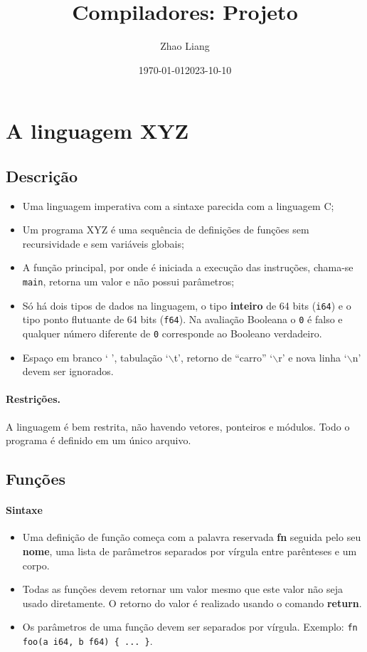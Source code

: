 \documentclass{article}
\date{\today}
\title{Compiladores: Projeto}
\author{Zhao Liang}
\date{2023-10-10}
\def\lang{{\sc XYZ}}
\begin{document}
\maketitle

\section{A linguagem \lang}

\subsection{Descrição}

\begin{itemize}
\item Uma linguagem imperativa com a sintaxe parecida com a 
linguagem C;
\item Um programa \lang{} é uma sequência de definições de 
funções sem recursividade e sem variáveis globais;
\item A função principal, por onde é iniciada a execução 
das instruções, chama-se {\tt main}, retorna um valor e 
não possui parâmetros;
\item Só há dois tipos de dados na linguagem, o tipo {\bf inteiro}
	de 64 bits ({\tt i64}) e o tipo ponto flutuante de 
	64 bits ({\tt f64}). Na avaliação Booleana o {\tt 0} é falso 
	e qualquer número diferente de {\tt 0} corresponde ao Booleano verdadeiro.
\item  Espaço em branco ` ', tabulação `$\backslash$t', 
   retorno de ``carro'' `$\backslash$r' e nova linha
`$\backslash$n' devem ser ignorados.
\end{itemize}

\paragraph{Restrições.} A linguagem é bem restrita, não havendo 
vetores, ponteiros e módulos. Todo o programa é definido em um 
único arquivo.

\subsection{Funções}

\paragraph{Sintaxe}
\begin{itemize}
    \item Uma definição de função começa com a palavra reservada 
    {\bf fn} seguida pelo seu {\bf nome}, uma lista de parâmetros 
    separados por vírgula entre parênteses e um corpo.
    \item Todas as funções devem retornar um valor mesmo que este 
    valor não seja usado diretamente. O retorno do valor é realizado 
    usando o comando {\bf return}.
    \item Os parâmetros de uma função devem ser separados por vírgula.
	    Exemplo: {\tt fn foo(a i64, b f64) \{ ... \}}.
\end{itemize}
\end{document}
